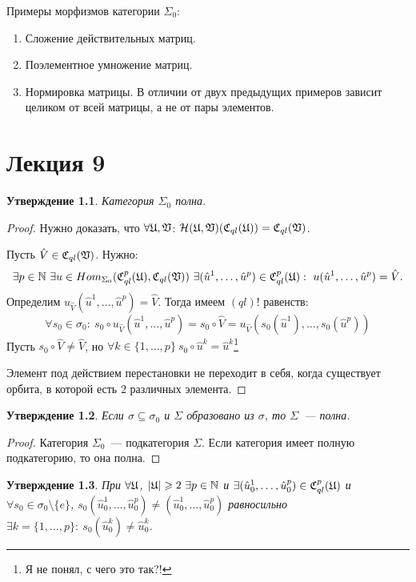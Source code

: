 \documentclass[a4paper, 12pt]{report}
\newtheorem{St}{Утверждение}[chapter]
\begin{document}
Примеры морфизмов категории $\Sigma_0$:
\begin{enumerate}
\item Сложение действительных матриц.
\item Поэлементное умножение матриц.
\item Нормировка матрицы. В отличии от двух предыдущих примеров зависит целиком от всей матрицы, а не от пары элементов.
\end{enumerate}

\chapter{Лекция 9}
\begin{St}
Категория $\Sigma_0$ полна.
\end{St}
\begin{proof}
Нужно доказать, что $\forall \mathfrak{U}, \mathfrak{V}$: $\mathcal{H}(\mathfrak{U}, \mathfrak{V})(\mathfrak{C}_{ql}(\mathfrak{U})) = \mathfrak{C}_{ql}(\mathfrak{V})$.

Пусть $\hat{V} \in \mathfrak{C}_{ql}(\mathfrak{V})$. Нужно:
\[
\exists p \in \mathbb{N} \ \exists u \in Hom_{\Sigma_0}(\mathfrak{C}_{ql}^p(\mathfrak{U}), \mathfrak{C}_{ql}(\mathfrak{V})) \ \exists (\hat{u}^1, \ldots, \hat{u}^p) \in \mathfrak{C}_{ql}^p(\mathfrak{U}): \ u(\hat{u}^1, \ldots, \hat{u}^p) = \hat{V}.
\]
Определим $u_{\hat{V}}(\hat{u}^1, \ldots, \hat{u}^p) = \hat{V}$. Тогда имеем $(ql)!$ равенств: 
\[
\forall s_0 \in \sigma_0: \ s_0 \circ u_{\hat{V}}(\hat{u}^1, \ldots, \hat{u}^p) = s_0 \circ \hat{V} = u_{\hat{V}}(s_0(\hat{u}^1), \ldots, s_0(\hat{u}^p))
\]
Пусть $s_0 \circ \hat{V} \neq \hat{V}$, но $\forall k \in \{1, \ldots, p \} \ s_0 \circ \hat{u}^k = \hat{u}^k$\footnote{Я не понял, с чего это так?!}

Элемент под действием перестановки не переходит в себя, когда существует орбита, в которой есть $2$ различных элемента. 
\end{proof}

\begin{St}
Если $\sigma \subseteq \sigma_0$ и $\Sigma$ образовано из $\sigma$, то $\Sigma$~--- полна. 
\end{St}
\begin{proof}
Категория $\Sigma_0$~--- подкатегория $\Sigma$. Если категория имеет полную подкатегорию, то она полна. 
\end{proof}

\begin{St}
При $\forall \mathfrak{U}$, $|\mathfrak{U}| \geqslant 2 \ \exists p \in \mathbb{N}$ и $\exists (\hat{u}_0^1, \ldots, \hat{u}_0^p) \in \mathfrak{C}_{ql}^p(\mathfrak{U})$ и $\forall s_0 \in \sigma_0 \setminus \{e\}$, $s_0(\hat{u}_0^1, \ldots, \hat{u}_0^p) \neq (\hat{u}_0^1, \ldots, \hat{u}_0^p)$ равносильно $\exists k = \{1, \ldots, p\}: \ s_0(\hat{u}_0^k) \neq \hat{u}_0^k$.
\end{St}
\end{document}
